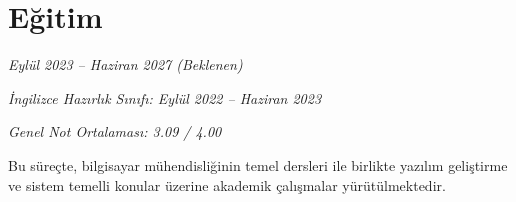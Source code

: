 \section*{Eğitim}

\textit{Eylül 2023 -- Haziran 2027 (Beklenen)}

\textit{İngilizce Hazırlık Sınıfı: Eylül 2022 -- Haziran 2023}

\textit{Genel Not Ortalaması: 3.09 / 4.00}

Bu süreçte, bilgisayar mühendisliğinin temel dersleri ile birlikte yazılım geliştirme ve sistem temelli konular üzerine akademik çalışmalar yürütülmektedir.
